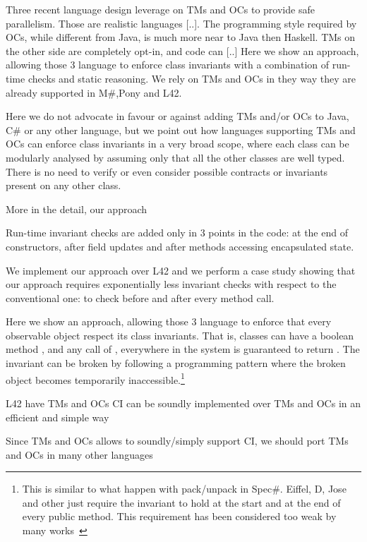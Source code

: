 Three recent language design leverage on TMs and OCs to provide safe parallelism.
Those are realistic languages [..].
The programming style required by OCs, while different from Java, is much more near to Java then Haskell. TMs on the other side are completely opt-in, and code can [..]
Here we show an approach, allowing those 3 language 
to  enforce class invariants with a combination of run-time checks and static reasoning.
We rely on TMs and OCs in they way they are already supported in M\#,Pony and L42.

Here we do not advocate in favour or against adding
TMs and/or OCs to Java, C\# or any other language, but we point out how languages supporting TMs and OCs can
enforce class invariants in a very broad scope, where
each class can be modularly analysed by assuming only that all the other classes are well typed.
There is no need to verify or even consider possible contracts or invariants present on any other class.

\LINE
More in the detail, our approach 

Run-time invariant checks are added only in 3 points in the code: at the end of constructors, after field updates and after methods accessing encapsulated state.


We implement our approach over L42 and we perform a
case study showing that our approach requires 
exponentially less invariant checks with respect to the conventional one: to check before and after every method call.


Here we show an approach, allowing those 3 language 
to  enforce that every observable object respect its class invariants.
That is, classes can have a boolean method \Q@invariant@,
and any call of \Q@invariant@, everywhere in the system is guaranteed to return \Q@true@.
The invariant can be broken by following a programming pattern where the broken object becomes temporarily inaccessible.\footnote{
This is similar to what happen with pack/unpack in Spec\#.
Eiffel, D, Jose and other just require the invariant to hold at the start and at the end of every public method. This requirement has been considered too weak by many works~\cite{??}
}





L42 have TMs and OCs
CI can be soundly implemented over TMs and OCs
in an efficient and simple way

Since TMs and OCs allows to soundly/simply support CI,
we should port TMs and OCs in many other languages



